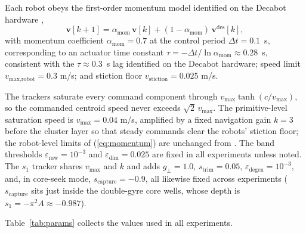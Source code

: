 \documentclass[lettersize,journal]{IEEEtran}
\begin{document}
Each robot obeys the first-order momentum model identified on the
Decabot hardware \cite{14},
\begin{equation}
    \mathbf{v}[k+1] = \alpha_{\text{mom}}\,\mathbf{v}[k]
    + (1 - \alpha_{\text{mom}})\,\mathbf{v}^{\text{des}}[k],
    \label{eq:momentum}
\end{equation}
with momentum coefficient $\alpha_{\text{mom}} = 0.7$ at the control
period $\Delta t = 0.1$~s, corresponding to an actuator time constant
$\tau = -\Delta t/\ln\alpha_{\text{mom}} \approx 0.28$~s, consistent
with the $\tau \approx 0.3$~s lag identified on the Decabot hardware;
speed limit $v_{\text{max,robot}} = 0.3$ m/s; and stiction floor
$v_{\text{stiction}} = 0.025$ m/s.

The trackers saturate every command component through $v_{\max}\tanh(c /
v_{\max})$, so the commanded centroid speed never exceeds
$\sqrt{2}\,v_{\max}$. The primitive-level saturation speed is $v_{\max}
= 0.04$ m/s, amplified by a fixed navigation gain $k = 3$ before the
cluster layer so that steady commands clear the robots' stiction floor;
the robot-level limits of (\ref{eq:momentum}) are unchanged from \cite{14}.
The band thresholds $\varepsilon_{\text{raw}} = 10^{-3}$ and
$\varepsilon_{\text{dim}} = 0.025$ are fixed in all experiments unless
noted. The $s_1$ tracker shares $v_{\max}$ and $k$ and adds $g_\perp =
1.0$, $s_{\text{trim}} = 0.05$, $\varepsilon_{\text{degen}} = 10^{-3}$,
and, in core-seek mode, $s_{\text{capture}} = -0.9$, all likewise fixed
across experiments ($s_{\text{capture}}$ sits just inside the
double-gyre core wells, whose depth is $s_1 = -\pi^2 A \approx
-0.987$).

Table~\ref{tab:params} collects the values used in all experiments.
\end{document}
